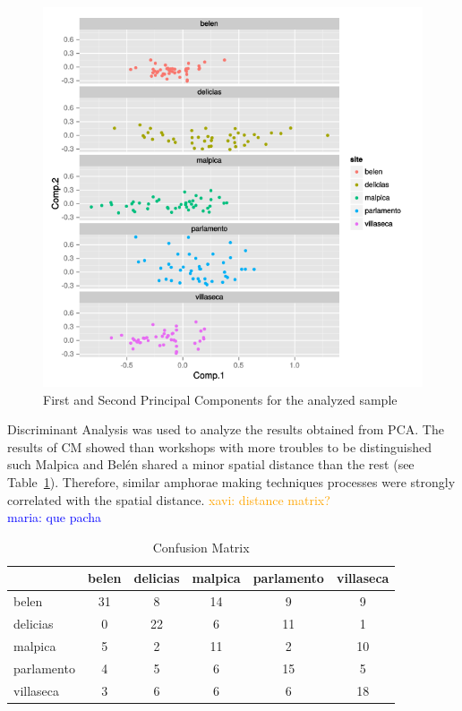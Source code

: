 \documentclass[review]{elsarticle}
\newcommand{\memo}[2]{\textcolor{#1}{#2}}
\newcommand{\xavi}[1]{\memo{orange}{xavi: #1\\}}
\newcommand{\maria}[1]{\memo{blue}{maria: #1\\}}
\begin{document}
\begin{figure}[htp]
	\centering
\includegraphics[scale=0.40]{pca.png}
\caption{First and Second Principal Components for the analyzed sample}
\label{pca}
\end{figure} 



Discriminant Analysis was used to analyze the results obtained from PCA. The results of CM showed than workshops with more troubles to be distinguished such Malpica and Bel\'en shared a minor spatial distance than the rest (see Table~\ref{table:confusion}). Therefore, similar amphorae making techniques processes were strongly correlated with the spatial distance. 
\xavi{distance matrix?}
\maria{que pacha}

\begin{table}[htp]
\begin{tabular}{lccccc}
\hline
 & belen & delicias & malpica & parlamento & villaseca\\ \hline
belen & 31 &       8 &      14 &          9 &          9 \\
delicias       & 0 &        22 &       6&         11&         1 \\
malpica &       5  &     2  &    11   &       2  &      10 \\
parlamento &     4  &      5 &      6 &        15 &        5\\
villaseca   &   3   &     6   &    6  &        6  &     18 \\
\hline

\end{tabular}
\caption{Confusion Matrix}
\label{table:confusion}
\end{table}
\end{document}
